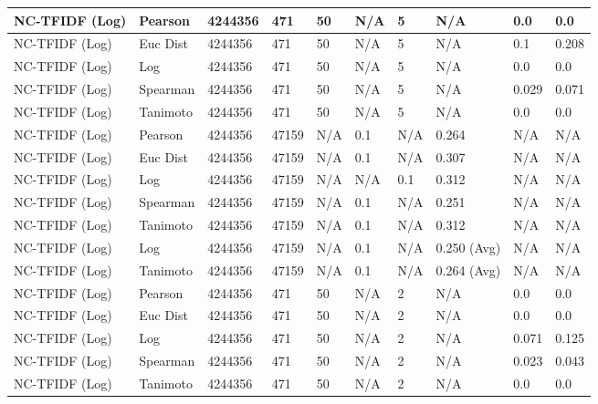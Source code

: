 \documentclass{article}
\begin{document}
\begin{longtable}{ |p{1.7cm}|p{1.9cm}|p{1.5cm}|p{1.5cm}|p{0.75cm}|p{0.75cm}|p{0.75cm}|p{0.75cm}|p{1.5cm}|p{1.5cm}|}
    NC-TFIDF (Log)  & Pearson & 4244356 & 471 & 50 & N/A  & 5 & N/A & 0.0 & 0.0  \\ \hline
    NC-TFIDF (Log)  & Euc Dist & 4244356 & 471 & 50 & N/A  & 5 & N/A &0.1 & 0.208   \\ \hline
    NC-TFIDF (Log)  & Log & 4244356 & 471 & 50 & N/A & 5 & N/A & 0.0 & 0.0  \\ \hline
    NC-TFIDF (Log)  & Spearman & 4244356 & 471 & 50 & N/A  & 5 & N/A &0.029 & 0.071 \\ \hline
    NC-TFIDF (Log)  & Tanimoto & 4244356 & 471 & 50 & N/A  & 5 & N/A & 0.0 & 0.0 \\ \hline
    
    NC-TFIDF (Log) & Pearson & 4244356 & 47159 & N/A & 0.1 & N/A & 0.264 & N/A & N/A  \\ \hline
    NC-TFIDF (Log) & Euc Dist & 4244356 & 47159 & N/A & 0.1 & N/A & 0.307 & N/A & N/A   \\ \hline
    NC-TFIDF (Log) & Log & 4244356 & 47159 & N/A &  N/A & 0.1 & 0.312 & N/A & N/A  \\ \hline
    NC-TFIDF (Log)   & Spearman & 4244356 & 47159 & N/A & 0.1 & N/A & 0.251 & N/A & N/A \\ \hline
    NC-TFIDF (Log)   & Tanimoto & 4244356 & 47159 & N/A & 0.1 & N/A & 0.312 & N/A & N/A \\ \hline
    NC-TFIDF (Log)  & Log & 4244356 & 47159 & N/A & 0.1 & N/A & 0.250 (Avg) & N/A & N/A \\ \hline
    NC-TFIDF (Log) & Tanimoto & 4244356 & 47159 & N/A & 0.1 & N/A & 0.264 (Avg) & N/A & N/A \\ \hline
    
    NC-TFIDF (Log)  & Pearson & 4244356 & 471 & 50 & N/A  & 2 & N/A & 0.0 & 0.0  \\ \hline
    NC-TFIDF (Log)  & Euc Dist & 4244356 & 471 & 50 & N/A  & 2 & N/A &0.0 & 0.0   \\ \hline
    NC-TFIDF (Log)  & Log & 4244356 & 471 & 50 & N/A & 2 & N/A & 0.071 & 0.125  \\ \hline
    NC-TFIDF (Log)  & Spearman & 4244356 & 471 & 50 & N/A  & 2 & N/A &0.023 & 0.043 \\ \hline
    NC-TFIDF (Log)  & Tanimoto & 4244356 & 471 & 50 & N/A  & 2 & N/A & 0.0 & 0.0 \\ \hline


\end{longtable}
\end{document}
